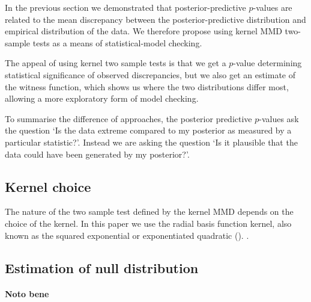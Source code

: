 \documentclass{article} %
\begin{document}
In the previous section we demonstrated that posterior-predictive $p$-values are related to the mean discrepancy between the posterior-predictive distribution and empirical distribution of the data.
We therefore propose using kernel MMD two-sample tests as a means of statistical-model checking.

The appeal of using kernel two sample tests is that we get a $p$-value determining statistical significance of observed discrepancies, but we also get an estimate of the witness function, which shows us where the two distributions differ most, allowing a more exploratory form of model checking.

To summarise the difference of approaches, the posterior predictive $p$-values ask the question `Is the data extreme compared to my posterior as measured by a particular statistic?'.
Instead we are asking the question `Is it plausible that the data could have been generated by my posterior?'.

\subsection{Kernel choice}

The nature of the two sample test defined by the kernel MMD depends on the choice of the kernel.
In this paper we use the radial basis function kernel, also known as the squared exponential or exponentiated quadratic ().
.


\subsection{Estimation of null distribution}


\paragraph{Noto bene}
\end{document}
